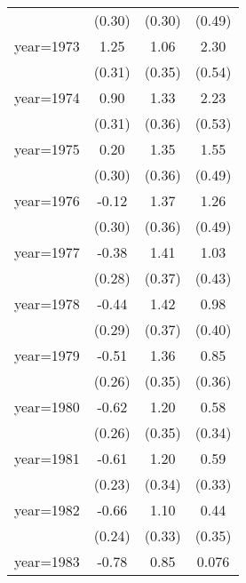 \begin{sidewaystable}[htbp]
\begin{tabular}{l*{3}{c}}
                &   (0.30)         &   (0.30)         &   (0.49)         \\
\addlinespace
year=1973       &     1.25\sym{***}&     1.06\sym{***}&     2.30\sym{***}\\
                &   (0.31)         &   (0.35)         &   (0.54)         \\
\addlinespace
year=1974       &     0.90\sym{***}&     1.33\sym{***}&     2.23\sym{***}\\
                &   (0.31)         &   (0.36)         &   (0.53)         \\
\addlinespace
year=1975       &     0.20         &     1.35\sym{***}&     1.55\sym{***}\\
                &   (0.30)         &   (0.36)         &   (0.49)         \\
\addlinespace
year=1976       &    -0.12         &     1.37\sym{***}&     1.26\sym{**} \\
                &   (0.30)         &   (0.36)         &   (0.49)         \\
\addlinespace
year=1977       &    -0.38         &     1.41\sym{***}&     1.03\sym{**} \\
                &   (0.28)         &   (0.37)         &   (0.43)         \\
\addlinespace
year=1978       &    -0.44         &     1.42\sym{***}&     0.98\sym{**} \\
                &   (0.29)         &   (0.37)         &   (0.40)         \\
\addlinespace
year=1979       &    -0.51\sym{*}  &     1.36\sym{***}&     0.85\sym{**} \\
                &   (0.26)         &   (0.35)         &   (0.36)         \\
\addlinespace
year=1980       &    -0.62\sym{**} &     1.20\sym{***}&     0.58\sym{*}  \\
                &   (0.26)         &   (0.35)         &   (0.34)         \\
\addlinespace
year=1981       &    -0.61\sym{***}&     1.20\sym{***}&     0.59\sym{*}  \\
                &   (0.23)         &   (0.34)         &   (0.33)         \\
\addlinespace
year=1982       &    -0.66\sym{***}&     1.10\sym{***}&     0.44         \\
                &   (0.24)         &   (0.33)         &   (0.35)         \\
\addlinespace
year=1983       &    -0.78\sym{***}&     0.85\sym{**} &    0.076         \\

\end{tabular}
\end{sidewaystable}
